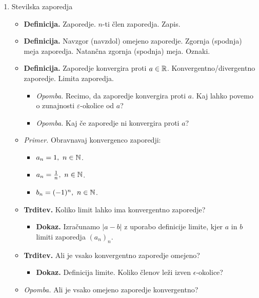 \begin{enumerate}
    \item Stevilska zaporedja
    \begin{itemize}
        \item \colorbox{purple!30}{\textbf{Definicija.}} Zaporedje. $n$-ti člen zaporedja. Zapis.
        \item \colorbox{purple!30}{\textbf{Definicija.}} Navzgor (navzdol) omejeno zaporedje. Zgornja (spodnja) meja zaporedja. Natančna zgornja (spodnja) meja. Oznaki.
        \item \colorbox{purple!30}{\textbf{Definicija.}} Zaporedje konvergira proti $a \in \mathbb{R}$. Konvergentno/divergentno zaporedje. Limita zaporedja.
        \begin{itemize}
            \item \colorbox{yellow!30}{\emph{Opomba.}} Recimo, da zaporedje konvergira proti $a$. Kaj lahko povemo o zunajnosti $\varepsilon$-okolice od $a$?
            \item \colorbox{yellow!30}{\emph{Opomba.}} Kaj če zaporedje ni konvergira proti $a$?
        \end{itemize}
        \item \colorbox{yellow!30}{\emph{Primer.}} Obravnavaj konvergenco zaporedji:
        \begin{itemize}
            \item $a_n = 1, \ n \in \mathbb{N}$.
            \item $a_n = \frac{1}{n}, \ n \in \mathbb{N}$.
            \item $b_n = (-1)^n, \ n \in \mathbb{N}$.
        \end{itemize}
        \item \colorbox{blue!30}{\textbf{Trditev.}}  Koliko limit lahko ima konvergentno zaporedje?
        \begin{itemize}
            \item \colorbox{green!30}{\textbf{Dokaz.}} Izračunamo $|a-b|$ z uporabo definicije limite, kjer $a$ in $b$ limiti zaporedja $(a_n)_n$.
        \end{itemize}
        \item \colorbox{blue!30}{\textbf{Trditev.}} Ali je vsako konvergentno zaporedje omejeno?
        \begin{itemize}
            \item \colorbox{green!30}{\textbf{Dokaz.}} Definicija limite. Koliko členov leži izven $\epsilon$-okolice?
        \end{itemize}
        \item \colorbox{yellow!30}{\emph{Opomba.}} Ali je vsako omejeno zaporedje konvergentno?
    \end{itemize}
    

\end{enumerate}
